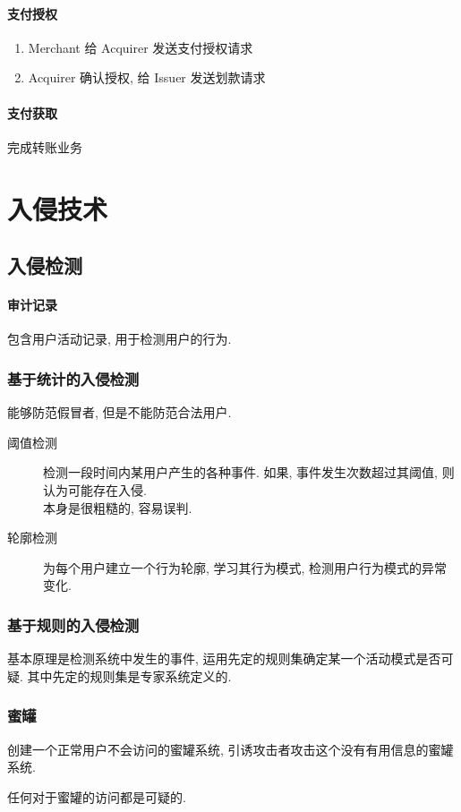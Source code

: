 \documentclass{ctexart}
\begin{document}
\clearpage
\paragraph{支付授权}
    \begin{enumerate}
        \item Merchant 给 Acquirer 发送支付授权请求
        \item Acquirer 确认授权, 给 Issuer 发送划款请求
    \end{enumerate}
\paragraph{支付获取}
    完成转账业务

\section{入侵技术}
\subsection{入侵检测}
\paragraph{审计记录} 包含用户活动记录, 用于检测用户的行为.
\subsubsection{基于统计的入侵检测}
    能够防范假冒者, 但是不能防范合法用户.\par
    \begin{description}
        \item[阈值检测] 检测一段时间内某用户产生的各种事件.
            如果, 事件发生次数超过其阈值, 则认为可能存在入侵.\\
            本身是很粗糙的, 容易误判.
        \item[轮廓检测] 为每个用户建立一个行为轮廓, 学习其行为模式,
            检测用户行为模式的异常变化.
    \end{description}
\subsubsection{基于规则的入侵检测}
    基本原理是检测系统中发生的事件,
    运用先定的规则集确定某一个活动模式是否可疑.
    其中先定的规则集是专家系统定义的.
\subsubsection{蜜罐}
    创建一个正常用户不会访问的蜜罐系统, 
    引诱攻击者攻击这个没有有用信息的蜜罐系统.\par
    任何对于蜜罐的访问都是可疑的.
\end{document}
